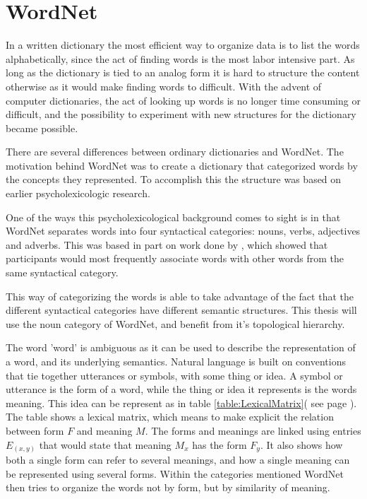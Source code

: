 \section{WordNet}
\label{WordNet}
In a written dictionary the most efficient way to organize data is to list the words alphabetically,
since the act of finding words is the most labor intensive part.
As long as the dictionary is tied to an analog form it is hard to structure the content otherwise as it would make
finding words to difficult.
With the advent of computer dictionaries, the act of looking up words is no longer time consuming or difficult,
and the possibility to experiment with new structures for the dictionary became possible.

There are several differences between ordinary dictionaries and WordNet.
The motivation behind WordNet was to create a dictionary that categorized words by the concepts they represented.
To accomplish this the structure was based on earlier psycholexicologic research\citep{Miller1990}.

One of the ways this psycholexicological background comes to sight is in that WordNet separates words into four syntactical categories: nouns, verbs, adjectives and adverbs\citep{Miller1995}.
This was based in part on work done by \citet{Fillenbaum1965}, which showed that participants would most frequently
associate words with other words from the same syntactical category.

This way of categorizing the words is able to take advantage of the fact that the different syntactical categories have different semantic structures.
This thesis will use the noun category of WordNet, and benefit from it's topological hierarchy.

The word 'word' is ambiguous as it can be used to describe the representation of a word, and its underlying semantics.
Natural language is built on conventions that tie together utterances or symbols, with some thing or idea.
A symbol or utterance is the form of a word, while the thing or idea it represents is the words meaning.
This idea can be represent as in table \ref{table:LexicalMatrix}( see page \pageref{table:LexicalMatrix}).
The table shows a lexical matrix, which means to make explicit the relation between form $F$ and meaning $M$.
The forms and meanings are linked using entries $E_{(x,y)}$ that would state that meaning $M_x$ has the form $F_y$.
It also shows how both a single form can refer to several meanings,
and how a single meaning can be represented using several forms.
Within the categories mentioned WordNet then tries to organize the words not by form,
but by similarity of meaning.

